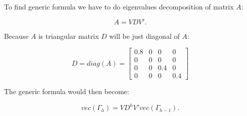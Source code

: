 \begin{solution}
To find generic formula we have to do eigenvalues decomposition of matrix $A$:

\begin{equation}
              A = VDV'.
\end{equation}

Because $A$ is triangular matrix $D$ will be just diagonal of $A$:

\begin{equation}
              D = diag(A) 
							  = \left[\begin{array}{llll} 0.8             						& 0                 & 0                 & 0                \\
									                          0                           & 0                 & 0                 & 0                \\
																						0   											  & 0                 & 0.4               & 0                \\ 
																						0                           & 0                 & 0                 & 0.4              \end{array}\right]
\end{equation}

The generic formula would then become:

\begin{equation}
              vec(\Gamma_h)= VD^hV'vec(\Gamma_{h-1}).
\end{equation}

\end{solution}